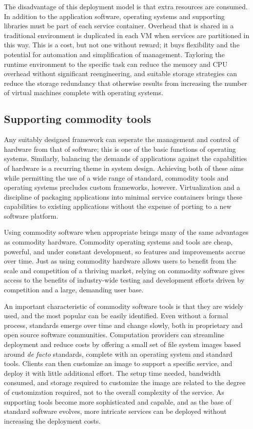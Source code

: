 The disadvantage of this deployment model is that extra resources are consumed. In addition to the application software, operating systems and supporting libraries must be part of each service container. Overhead that is shared in a traditional environment is duplicated in each VM when services are partitioned in this way. This is a cost, but not one without reward; it buys flexibility and the potential for automation and simplification of management. Tayloring the runtime environment to the specific task can reduce the memory and CPU overhead without significant reengineering, and suitable storage strategies can reduce the storage redundancy that otherwise results from increasing the number of virtual machines complete with operating systems.

\subsection{Supporting commodity tools}

Any suitably designed framework can seperate the management and control of hardware from that of software; this is one of the basic functions of operating systems. Similarly, balancing the demands of applications against the capabilities of hardware is a recurring theme in system design. Achieving both of these aims while permitting the use of a wide range of standard, commodity tools and operating systems precludes custom frameworks, however. Virtualization and a discipline of packaging applications into minimal service containers brings these capabilities to existing applications without the expense of porting to a new software platform.

Using commodity software when appropriate brings many of the same advantages as commodity hardware. Commodity operating systems and tools are cheap, powerful, and under constant development, so features and improvements accrue over time. Just as using commodity hardware allows users to benefit from the scale and competition of a thriving market, relying on commodity software gives access to the benefits of industry-wide testing and development efforts driven by competition and a large, demanding user base.

An important characteristic of commodity software tools is that they are widely used, and the most popular can be easily identified. Even without a formal process, standards emerge over time and change slowly, both in proprietary and open source software communities. Computation providers can streamline deployment and reduce costs by offering a small set of file system images based around \emph{de facto} standards, complete with an operating system and standard tools. Clients can then customize an image to support a specific service, and deploy it with little additional effort. The setup time needed, bandwidth consumed, and storage required to customize the image are related to the degree of customization required, not to the overall complexity of the service. As supporting tools become more sophisticated and capable, and as the base of standard software evolves, more intricate services can be deployed without increasing the deployment costs.

